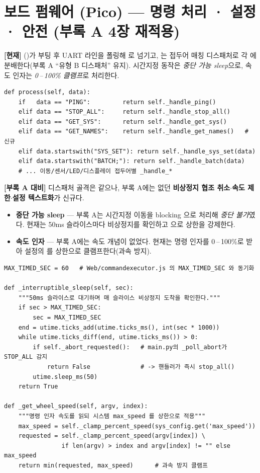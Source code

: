 \section{보드 펌웨어 (Pico) --- 명령 처리 · 설정 · 안전 (부록 A 4장 재적용)}
\textbf{[현재]} ()가 부팅 후 UART 라인을 폴링해
로 넘기고, 는 접두어 매칭 디스패처로 각
에 분배한다(부록 A ``유형 B 디스패처'' 유지). 시간지정 동작은 \emph{중단
가능 sleep}으로, 속도 인자는 \emph{0\,--\,100\% 클램프}로 처리한다.

\begin{verbatim}
def process(self, data):
    if   data == "PING":         return self._handle_ping()
    elif data == "STOP_ALL":     return self._handle_stop_all()
    elif data == "GET_SYS":      return self._handle_get_sys()
    elif data == "GET_NAMES":    return self._handle_get_names()   # 신규
    elif data.startswith("SYS_SET"): return self._handle_sys_set(data)
    elif data.startswith("BATCH;"): return self._handle_batch(data)
    # ... 이동/센서/LED/디스플레이 접두어별 _handle_*
\end{verbatim}

\smallskip
\noindent\textbf{[부록 A 대비]} 디스패처 골격은 같으나, 부록 A에는 없던 \textbf{비상정지 협조
취소}$\cdot$\textbf{속도 제한}$\cdot$\textbf{설정 텍스트화}가 신규다.

\begin{itemize}
  \item \textbf{중단 가능 sleep} --- 부록 A는 시간지정 이동을 blocking 으로 처리해
  \emph{중단 불가}였다. 현재는 50ms 슬라이스마다 비상정지를 확인하고 
  으로 상한을 강제한다.
  \item \textbf{속도 인자} --- 부록 A에는 속도 개념이 없었다. 현재는 명령 인자를 0\,--\,100\%로
  받아 설정의 를 상한으로 클램프한다(과속 방지).
\end{itemize}

\begin{verbatim}
MAX_TIMED_SEC = 60   # Web/commandexecutor.js 의 MAX_TIMED_SEC 와 동기화

def _interruptible_sleep(self, sec):
    """50ms 슬라이스로 대기하며 매 슬라이스 비상정지 도착을 확인한다."""
    if sec > MAX_TIMED_SEC:
        sec = MAX_TIMED_SEC
    end = utime.ticks_add(utime.ticks_ms(), int(sec * 1000))
    while utime.ticks_diff(end, utime.ticks_ms()) > 0:
        if self._abort_requested():   # main.py의 _poll_abort가 STOP_ALL 감지
            return False              # -> 핸들러가 즉시 stop_all()
        utime.sleep_ms(50)
    return True

def _get_wheel_speed(self, argv, index):
    """명령 인자 속도를 읽되 시스템 max_speed 를 상한으로 적용"""
    max_speed = self._clamp_percent_speed(sys_config.get('max_speed'))
    requested = self._clamp_percent_speed(argv[index]) \
                if len(argv) > index and argv[index] != "" else max_speed
    return min(requested, max_speed)      # 과속 방지 클램프
\end{verbatim}

